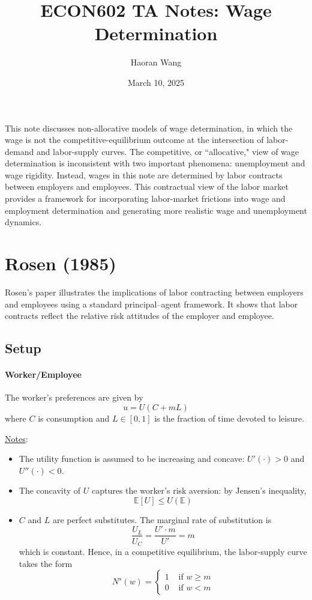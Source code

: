 \documentclass[12pt]{article}
\title{ECON602 TA Notes: Wage Determination}
\author{Haoran Wang}
\date{March 10, 2025}
\begin{document}
	\maketitle
	
	\tableofcontents 
	
		This note discusses non-allocative models of wage determination, in which the wage is not the competitive-equilibrium outcome at the intersection of labor-demand and labor-supply curves. The competitive, or ``allocative," view of wage determination is inconsistent with two important phenomena: unemployment and wage rigidity. Instead, wages in this note are determined by labor contracts between employers and employees. This contractual view of the labor market provides a framework for incorporating labor-market frictions into wage and employment determination and generating more realistic wage and unemployment dynamics. 
	
	\section{Rosen (1985)}
	 
		 Rosen's paper illustrates the implications of labor contracting between employers and employees using a standard principal--agent framework. It shows that labor contracts reflect the relative risk attitudes of the employer and employee.
	 
	 \subsection{Setup}
	 
	 \paragraph{Worker/Employee \\ [6pt]}
		 The worker's preferences are given by
	 \begin{equation}
	 	u = U(C + mL)
	 \end{equation}
		 where $C$ is consumption and $L \in [0,1]$ is the fraction of time devoted to leisure.	 
	 
	 \underline{Notes}:
	 \begin{itemize}
	 	\item The utility function is assumed to be increasing and concave: $U'(\cdot) > 0$ and $U''(\cdot) < 0$. 
		 	\item The concavity of $U$ captures the worker's risk aversion: by Jensen's inequality,
	 	\[\mathbb{E}[U] \leq U(\mathbb{E})\] 
	 	\item $C$ and $L$ are perfect substitutes. The marginal rate of substitution is 
	 	\[\frac{U_L}{U_C} = \frac{U' \cdot m}{U'} = m\]
		 	which is constant. Hence, in a competitive equilibrium, the labor-supply curve takes the form
	 	\begin{equation}
	 		N^s(w) = \begin{cases}
	 			1 & \text{ if } w \geq m \\
	 			0 & \text{ if } w < m
	 		\end{cases} 
	 	\end{equation}
	 \end{itemize}
 
\end{document}
